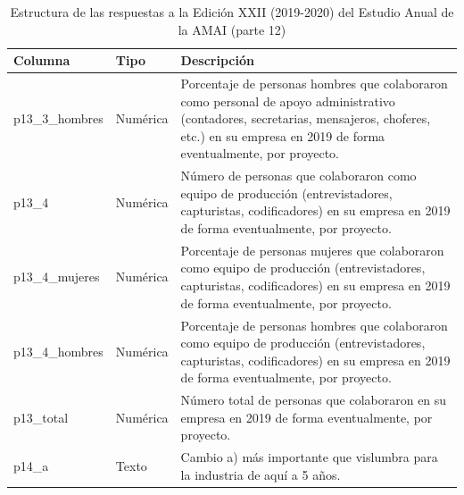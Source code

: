 \begin{table}[]
\caption{Estructura de las respuestas a la Edición XXII (2019-2020) del Estudio Anual de la AMAI (parte 12)}
\label{tab:raw2019_12}
\begin{tabular}{|l|l|l|}
\hline
Columna &
  Tipo &
  Descripción \\ \hline
p13\_3\_hombres &
  Numérica &
  \parbox[t]{8cm}{Porcentaje de personas hombres que colaboraron como personal de apoyo administrativo (contadores, secretarias, mensajeros, choferes, etc.) en su empresa en 2019 de forma eventualmente, por proyecto.\vspace{0.1cm}} \\ \hline
p13\_4 &
  Numérica &
  \parbox[t]{8cm}{Número de personas que colaboraron como equipo de producción (entrevistadores, capturistas, codificadores) en su empresa en 2019 de forma eventualmente, por proyecto.\vspace{0.1cm}} \\ \hline
p13\_4\_mujeres &
  Numérica &
  \parbox[t]{8cm}{Porcentaje de personas mujeres que colaboraron como equipo de producción (entrevistadores, capturistas, codificadores)   en su empresa en 2019 de forma eventualmente, por proyecto.\vspace{0.1cm}} \\ \hline
p13\_4\_hombres &
  Numérica &
  \parbox[t]{8cm}{Porcentaje de personas hombres que colaboraron como equipo de producción (entrevistadores, capturistas, codificadores) en su empresa en 2019 de forma eventualmente, por proyecto.\vspace{0.1cm}} \\ \hline
p13\_total &
  Numérica &
  \parbox[t]{8cm}{Número total de personas que colaboraron en su empresa en 2019 de forma eventualmente, por proyecto.\vspace{0.1cm}} \\ \hline
p14\_a &
  Texto &
  \parbox[t]{8cm}{Cambio a) más importante que vislumbra para la industria de aquí a 5 años.\vspace{0.1cm}} \\ \hline
\end{tabular}
\end{table}



